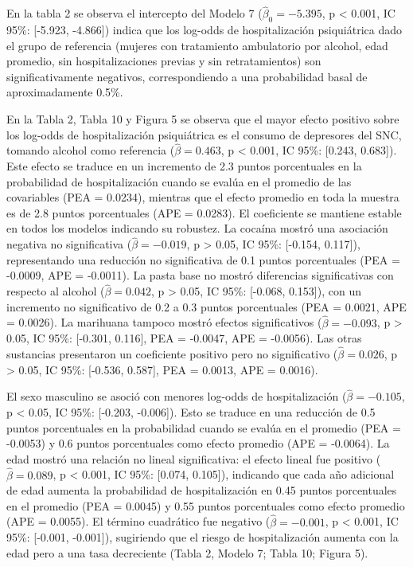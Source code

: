 \documentclass[
  spanish,
  10pt,
]{article}
\begin{document}
En la tabla 2 se observa el intercepto del Modelo 7
(\(\hat{\beta}_0 = -5.395\), p \textless{} 0.001, IC 95\%: {[}-5.923,
-4.866{]}) indica que los log-odds de hospitalización psiquiátrica dado
el grupo de referencia (mujeres con tratamiento ambulatorio por alcohol,
edad promedio, sin hospitalizaciones previas y sin retratamientos) son
significativamente negativos, correspondiendo a una probabilidad basal
de aproximadamente 0.5\%.

En la Tabla 2, Tabla 10 y Figura 5 se observa que el mayor efecto
positivo sobre los log-odds de hospitalización psiquiátrica es el
consumo de depresores del SNC, tomando alcohol como referencia
(\(\hat{\beta} = 0.463\), p \textless{} 0.001, IC 95\%: {[}0.243,
0.683{]}). Este efecto se traduce en un incremento de 2.3 puntos
porcentuales en la probabilidad de hospitalización cuando se evalúa en
el promedio de las covariables (PEA = 0.0234), mientras que el efecto
promedio en toda la muestra es de 2.8 puntos porcentuales (APE =
0.0283). El coeficiente se mantiene estable en todos los modelos
indicando su robustez. La cocaína mostró una asociación negativa no
significativa (\(\hat{\beta} = -0.019\), p \textgreater{} 0.05, IC 95\%:
{[}-0.154, 0.117{]}), representando una reducción no significativa de
0.1 puntos porcentuales (PEA = -0.0009, APE = -0.0011). La pasta base no
mostró diferencias significativas con respecto al alcohol
(\(\hat{\beta} = 0.042\), p \textgreater{} 0.05, IC 95\%: {[}-0.068,
0.153{]}), con un incremento no significativo de 0.2 a 0.3 puntos
porcentuales (PEA = 0.0021, APE = 0.0026). La marihuana tampoco mostró
efectos significativos (\(\hat{\beta} = -0.093\), p \textgreater{} 0.05,
IC 95\%: {[}-0.301, 0.116{]}, PEA = -0.0047, APE = -0.0056). Las otras
sustancias presentaron un coeficiente positivo pero no significativo
(\(\hat{\beta} = 0.026\), p \textgreater{} 0.05, IC 95\%: {[}-0.536,
0.587{]}, PEA = 0.0013, APE = 0.0016).

El sexo masculino se asoció con menores log-odds de hospitalización
(\(\hat{\beta} = -0.105\), p \textless{} 0.05, IC 95\%: {[}-0.203,
-0.006{]}). Esto se traduce en una reducción de 0.5 puntos porcentuales
en la probabilidad cuando se evalúa en el promedio (PEA = -0.0053) y 0.6
puntos porcentuales como efecto promedio (APE = -0.0064). La edad mostró
una relación no lineal significativa: el efecto lineal fue positivo
(\(\hat{\beta} = 0.089\), p \textless{} 0.001, IC 95\%: {[}0.074,
0.105{]}), indicando que cada año adicional de edad aumenta la
probabilidad de hospitalización en 0.45 puntos porcentuales en el
promedio (PEA = 0.0045) y 0.55 puntos porcentuales como efecto promedio
(APE = 0.0055). El término cuadrático fue negativo
(\(\hat{\beta} = -0.001\), p \textless{} 0.001, IC 95\%: {[}-0.001,
-0.001{]}), sugiriendo que el riesgo de hospitalización aumenta con la
edad pero a una tasa decreciente (Tabla 2, Modelo 7; Tabla 10; Figura
5).
\end{document}
